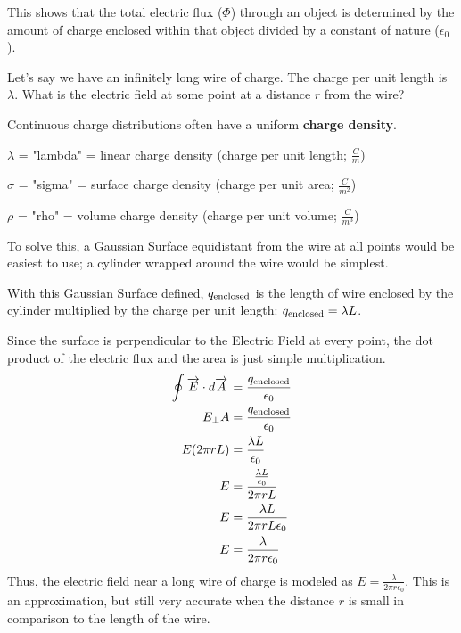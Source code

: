 \documentclass[12pt]{article}
\begin{document}
This shows that the total electric flux ($\Phi$) through an object is determined by
the amount of charge enclosed within that object divided by a constant of nature ($\epsilon_0$).

Let's say we have an infinitely long wire of charge. The charge per unit length is $\lambda$.
What is the electric field at some point at a distance $r$ from the wire?

\begin{figure}[H]
  \centering
  
\end{figure}

Continuous charge distributions often have a uniform \textbf{charge density}.
\begin{center}
  $\lambda$ = "lambda" = linear charge density (charge per unit length; $\frac{C}{m}$)

  $\sigma$ = "sigma" = surface charge density (charge per unit area; $\frac{C}{m^2}$)

  $\rho$ = "rho" = volume charge density (charge per unit volume; $\frac{C}{m^3}$)
\end{center}

To solve this, a Gaussian Surface equidistant from the wire at all points would be easiest
to use; a cylinder wrapped around the wire would be simplest.

\begin{figure}[H]
  \centering
  
\end{figure}

With this Gaussian Surface defined, $q_{\textup{enclosed}}$ is the length of wire enclosed
by the cylinder multiplied by the charge per unit length: $q_{\textup{enclosed}} = \lambda L$.

Since the surface is perpendicular to the Electric Field at every point, the dot product of
the electric flux and the area is just simple multiplication.
\begin{align*}
  \oint_{}^{} \overrightarrow{E} \cdot d \overrightarrow{A} \, &= \frac{q_{\textup{enclosed}}}{\epsilon_0} \\
  E_{\bot}A &= \frac{q_{\textup{enclosed}}}{\epsilon_0} \\
  E(2\pi rL) &= \frac{\lambda L}{\epsilon_0} \\
  E &= \frac{\frac{\lambda L}{\epsilon_0}}{2\pi rL} \\
  E &= \frac{\lambda L}{2\pi rL\epsilon_0} \\
  E &= \frac{\lambda}{2\pi r\epsilon_0}
\end{align*}
Thus, the electric field near a long wire of charge is modeled as $E = \frac{\lambda}{2\pi r\epsilon_0}$.
This is an approximation, but still very accurate when the distance $r$ is small in comparison
to the length of the wire.
\end{document}
